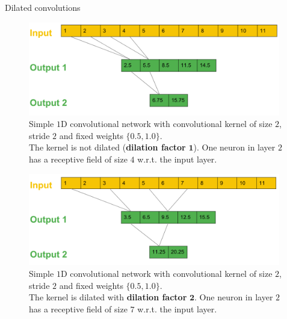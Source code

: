 \begin{vbframe}{Dilated convolutions}
\framebreak 

    \vspace*{0.5cm}
    \begin{figure}
        \centering
        \includegraphics[width=11cm]{plots/05_conv_variations/dilated/classic_conv.png}
        \caption{Simple $1$D convolutional network with convolutional kernel of size $2$, stride $2$ and fixed weights $\{0.5, 1.0\}$. \\ The kernel is not dilated (\textbf{dilation factor} $\mathbf{1}$). One neuron in layer $2$ has a receptive field of size $4$ w.r.t. the input layer. }
    \end{figure}
\framebreak 
    \vspace*{0.5cm}
    \begin{figure}
        \centering
        \includegraphics[width=11cm]{plots/05_conv_variations/dilated/dilated.png}
        \caption{Simple $1$D convolutional network with convolutional kernel of size $2$, stride $2$ and fixed weights $\{0.5, 1.0\}$. \\ The kernel is dilated with \textbf{dilation factor} $\mathbf{2}$. One neuron in layer $2$ has a receptive field of size $7$ w.r.t. the input layer. }
    \end{figure}
    
\framebreak 


\end{vbframe}
